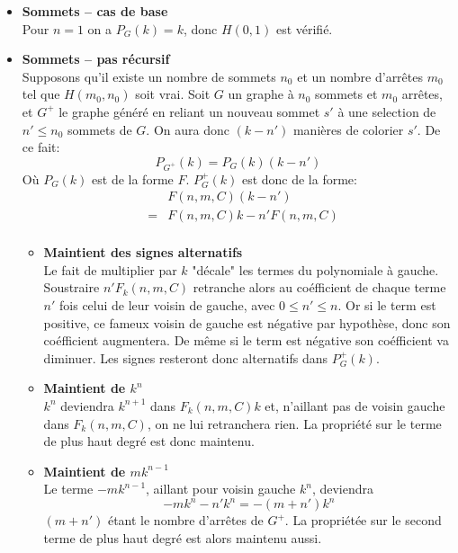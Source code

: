 \begin{itemize}
\item \textbf{Sommets -- cas de base} \\
Pour $n = 1$ on a $P_G(k) = k$, donc $H(0,1)$ est vérifié.
\item \textbf{Sommets -- pas récursif} \\ Supposons qu'il existe un nombre de sommets $n_0$ et un nombre d'arrêtes $m_0$ tel que $H(m_0,n_0)$ soit vrai. Soit $G$ un graphe à $n_0$ sommets et $m_0$ arrêtes, et $G^+$ le graphe généré en reliant un nouveau sommet $s'$ à une selection de $n' \leq n_0$ sommets de $G$. On aura donc $(k-n')$ manières de colorier $s'$. De ce fait:
\[ P_{G^+}(k) = P_G(k)(k-n') \]
Où $P_G(k)$ est de la forme $F$. $P_G^+(k)$ est donc de la forme:
\begin{eqnarray*}
&&	F(n,m,C)(k-n')			\\
&=& F(n,m,C)k - n'F(n,m,C)	\\
\end{eqnarray*} 
\begin{itemize}
\item \textbf{Maintient des signes alternatifs} \\ 
Le fait de multiplier par $k$ "décale" les termes du polynomiale à gauche. Soustraire $n'F_k(n,m,C)$ retranche alors au coéfficient de chaque terme $n'$ fois celui de leur voisin de gauche, avec $0 \leq n' \leq n$. Or si le term est positive, ce fameux voisin de gauche est négative par hypothèse, donc son coéfficient augmentera. De même si le term est négative son coéfficient va diminuer. Les signes resteront donc alternatifs dans $P_G^+(k)$.
\item \textbf{Maintient de $k^n$} \\
$k^{n}$ deviendra $k^{n+1}$ dans $F_k(n,m,C)k$ et, n'aillant pas de voisin gauche dans $F_k(n,m,C)$, on ne lui retranchera rien. La propriété sur le terme de plus haut degré est donc maintenu.
\item \textbf{Maintient de $mk^{n-1}$} \\
Le terme $-mk^{n-1}$, aillant pour voisin gauche $k^n$, deviendra \[-mk^n - n'k^n = -(m+n')k^n \] $(m+n')$ étant le nombre d'arrêtes de $G^+$. La propriétée sur le second terme de plus haut degré est alors maintenu aussi.
\end{itemize}


\end{itemize}
